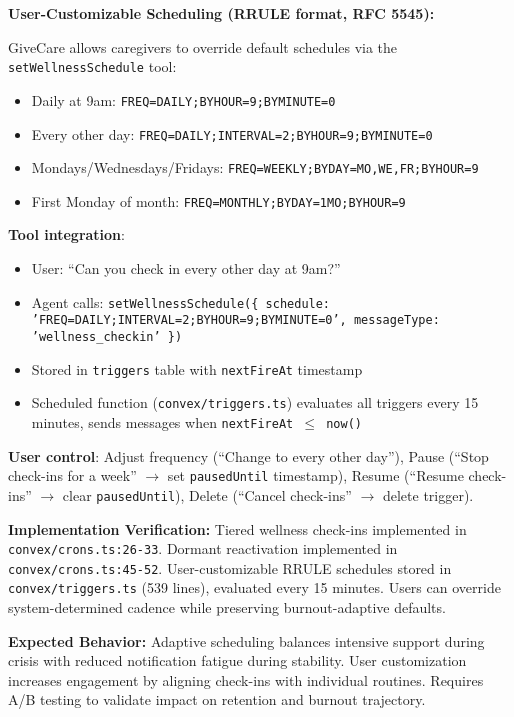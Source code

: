 \documentclass{article}
\begin{document}
\textbf{User-Customizable Scheduling (RRULE format, RFC 5545):}

GiveCare allows caregivers to override default schedules via the \texttt{setWellnessSchedule} tool:
\begin{itemize}
    \item Daily at 9am: \texttt{FREQ=DAILY;BYHOUR=9;BYMINUTE=0}
    \item Every other day: \texttt{FREQ=DAILY;INTERVAL=2;BYHOUR=9;BYMINUTE=0}
    \item Mondays/Wednesdays/Fridays: \texttt{FREQ=WEEKLY;BYDAY=MO,WE,FR;BYHOUR=9}
    \item First Monday of month: \texttt{FREQ=MONTHLY;BYDAY=1MO;BYHOUR=9}
\end{itemize}

\textbf{Tool integration}:
\begin{itemize}
    \item User: ``Can you check in every other day at 9am?''
    \item Agent calls: \texttt{setWellnessSchedule(\{ schedule: 'FREQ=DAILY;INTERVAL=2;BYHOUR=9;BYMINUTE=0', messageType: 'wellness\_checkin' \})}
    \item Stored in \texttt{triggers} table with \texttt{nextFireAt} timestamp
    \item Scheduled function (\texttt{convex/triggers.ts}) evaluates all triggers every 15 minutes, sends messages when \texttt{nextFireAt $\leq$ now()}
\end{itemize}

\textbf{User control}: Adjust frequency (``Change to every other day''), Pause (``Stop check-ins for a week'' $\rightarrow$ set \texttt{pausedUntil} timestamp), Resume (``Resume check-ins'' $\rightarrow$ clear \texttt{pausedUntil}), Delete (``Cancel check-ins'' $\rightarrow$ delete trigger).

\textbf{Implementation Verification:} Tiered wellness check-ins implemented in \texttt{convex/crons.ts:26-33}. Dormant reactivation implemented in \texttt{convex/crons.ts:45-52}. User-customizable RRULE schedules stored in \texttt{convex/triggers.ts} (539 lines), evaluated every 15 minutes. Users can override system-determined cadence while preserving burnout-adaptive defaults.

\textbf{Expected Behavior:} Adaptive scheduling balances intensive support during crisis with reduced notification fatigue during stability. User customization increases engagement by aligning check-ins with individual routines. Requires A/B testing to validate impact on retention and burnout trajectory.
\end{document}
